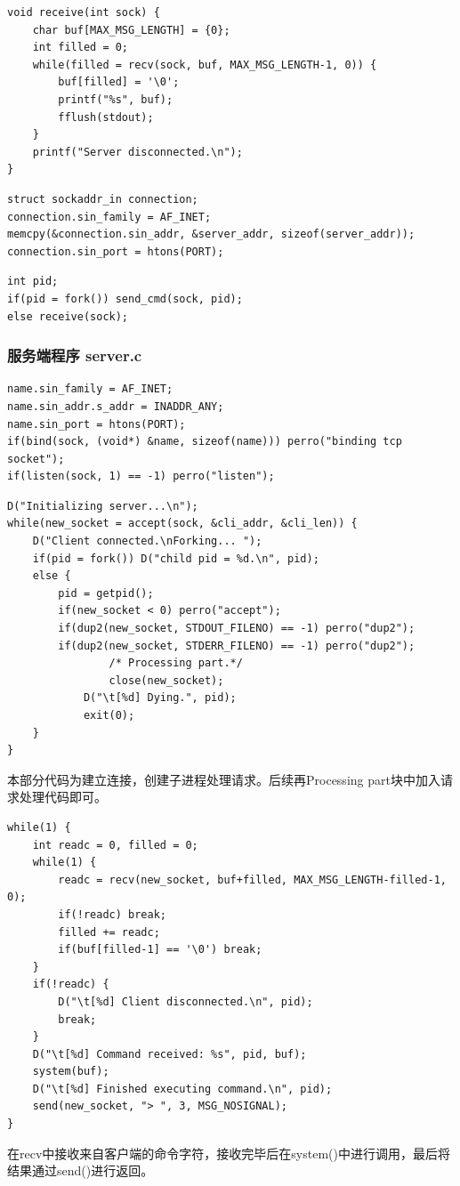 \documentclass[UTF8]{ctexart}
\begin{document}
\begin{lstlisting}
void receive(int sock) {
	char buf[MAX_MSG_LENGTH] = {0};
	int filled = 0;	
	while(filled = recv(sock, buf, MAX_MSG_LENGTH-1, 0)) {
		buf[filled] = '\0';
		printf("%s", buf);
		fflush(stdout);		
	}	
	printf("Server disconnected.\n");
}
\end{lstlisting}

\begin{lstlisting}
struct sockaddr_in connection;
connection.sin_family = AF_INET;
memcpy(&connection.sin_addr, &server_addr, sizeof(server_addr));
connection.sin_port = htons(PORT);
\end{lstlisting}

\begin{lstlisting}
int pid;	
if(pid = fork()) send_cmd(sock, pid);
else receive(sock);
\end{lstlisting}

\subsubsection{服务端程序 server.c}
\begin{lstlisting}
name.sin_family = AF_INET;
name.sin_addr.s_addr = INADDR_ANY;
name.sin_port = htons(PORT);
if(bind(sock, (void*) &name, sizeof(name))) perro("binding tcp socket");
if(listen(sock, 1) == -1) perro("listen");

\end{lstlisting}

\begin{lstlisting}
D("Initializing server...\n");
while(new_socket = accept(sock, &cli_addr, &cli_len)) {
	D("Client connected.\nForking... ");
	if(pid = fork()) D("child pid = %d.\n", pid);
	else {
		pid = getpid();
		if(new_socket < 0) perro("accept");
		if(dup2(new_socket, STDOUT_FILENO) == -1) perro("dup2");
		if(dup2(new_socket, STDERR_FILENO) == -1) perro("dup2");
                /* Processing part.*/
                close(new_socket);
        	D("\t[%d] Dying.", pid);
        	exit(0);
	}
}
\end{lstlisting}\par{本部分代码为建立连接，创建子进程处理请求。后续再Processing part块中加入请求处理代码即可。}


\begin{lstlisting}
while(1) {
	int readc = 0, filled = 0;
	while(1) {
		readc = recv(new_socket, buf+filled, MAX_MSG_LENGTH-filled-1, 0);
		if(!readc) break;
		filled += readc;
		if(buf[filled-1] == '\0') break;
	}
	if(!readc) {
		D("\t[%d] Client disconnected.\n", pid);
		break;
	}
	D("\t[%d] Command received: %s", pid, buf);
	system(buf);
	D("\t[%d] Finished executing command.\n", pid);
	send(new_socket, "> ", 3, MSG_NOSIGNAL);
}

\end{lstlisting}\par{在recv中接收来自客户端的命令字符，接收完毕后在system()中进行调用，最后将结果通过send()进行返回。}
\end{document}

